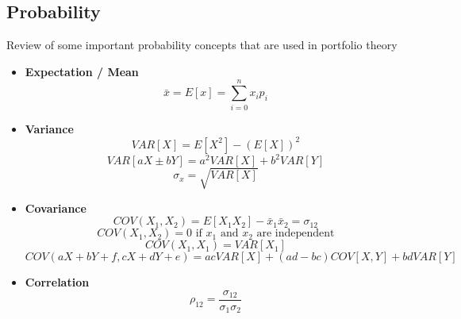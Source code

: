 \documentclass[11pt]{article}
\begin{document}
\subsection{Probability}
Review of some important probability concepts that are used in portfolio theory
\begin{itemize}
\item \textbf{Expectation / Mean}
$$ \bar{x} = E[x] = \sum_{i=0}^n x_ip_i $$
\item \textbf{Variance}
$$ VAR[X] = E[X^2] - (E[X])^2$$ 
$$ VAR[aX \pm bY] = a^2VAR[X] + b^2VAR[Y]$$
$$ \sigma_x = \sqrt{VAR[X]}$$
\item \textbf{Covariance}
$$ COV(X_1, X_2) = E[X_1X_2] - \bar{x}_1\bar{x}_2 = \sigma_{12}$$
$$ COV(X_1, X_2) = 0  \text{ if } x_1 \text{ and } x_2 \text { are independent}$$
$$ COV(X_1, X_1) = VAR[X_1]$$
$$ COV(aX + bY + f, cX+dY+e) = acVAR[X] +(ad-bc) COV[X,Y] + bdVAR[Y]$$
\item \textbf{Correlation}
$$ \rho_{12} = \frac{\sigma_{12}}{\sigma_1 \sigma_2}$$
\end{itemize}
\end{document}
